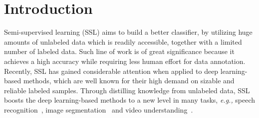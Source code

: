\documentclass[letterpaper]{article} \usepackage{aaai19}  \usepackage{times}  \usepackage{helvet}  \usepackage{courier}  \usepackage{url}  \usepackage{graphicx}  \usepackage{algorithm}
\begin{document}
\section{Introduction} \label{sec:introduction}
\noindent Semi-supervised learning (SSL) aims to build a better classifier, by utilizing huge amounts of unlabeled data which is readily accessible, together with a limited number of labeled data. Such line of work is of great significance because it achieves a high accuracy while requiring less human effort for data annotation. Recently, SSL has gained considerable attention when applied to deep learning-based methods, which are well known for their high demand on sizable and reliable labeled samples. Through distilling knowledge from unlabeled data, SSL boosts the deep learning-based methods to a new level in many tasks, \emph{e.g.,} speech recognition~\cite{dai2015semi}, image segmentation~\cite{papandreou2015weakly} and video understanding~\cite{caelles2017one}.
\end{document}
